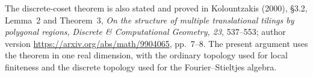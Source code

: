 The discrete-coset theorem is also stated and proved in
Kolountzakis (2000), \S3.2, Lemma~2 and Theorem~3,
\emph{On the structure of multiple translational tilings
by polygonal regions},
\emph{Discrete \& Computational Geometry, 23}, 537--553;
author version \url{https://arxiv.org/abs/math/9904065},
pp.~7--8.  The present argument uses the theorem in one
real dimension, with the ordinary topology used for
local finiteness and the discrete topology used for
the Fourier--Stieltjes algebra.
